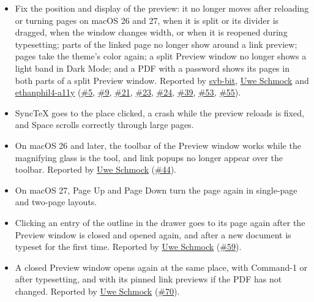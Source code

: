 \documentclass[11pt,letterpaper]{article}
\begin{document}
\begin{itemize}
\item Fix the position and display of the preview: it no longer moves after reloading or turning pages on macOS 26 and 27, when it is split or its divider is dragged, when the window changes width, or when it is reopened during typesetting; parts of the linked page no longer show around a link preview; pages take the theme’s color again; a split Preview window no longer shows a light band in Dark Mode; and a PDF with a password shows its pages in both parts of a split Preview window. Reported by \href{https://github.com/svb-bit}{svb-bit}, \href{https://github.com/Uwe-Schmock}{Uwe Schmock} and \href{https://github.com/ethanphil4-a11y}{ethanphil4-a11y} (\href{https://github.com/TeXShopProject/TeXShop/issues/5}{\#5}, \href{https://github.com/TeXShopProject/TeXShop/issues/9}{\#9}, \href{https://github.com/TeXShopProject/TeXShop/issues/21}{\#21}, \href{https://github.com/TeXShopProject/TeXShop/issues/23}{\#23}, \href{https://github.com/TeXShopProject/TeXShop/issues/24}{\#24}, \href{https://github.com/TeXShopProject/TeXShop/issues/39}{\#39}, \href{https://github.com/TeXShopProject/TeXShop/issues/53}{\#53}, \href{https://github.com/TeXShopProject/TeXShop/issues/55}{\#55}).
\item SyncTeX goes to the place clicked, a crash while the preview reloads is fixed, and Space scrolls correctly through large pages.
\item On macOS 26 and later, the toolbar of the Preview window works while the magnifying glass is the tool, and link popups no longer appear over the toolbar. Reported by \href{https://github.com/Uwe-Schmock}{Uwe Schmock} (\href{https://github.com/TeXShopProject/TeXShop/issues/44}{\#44}).
\item On macOS 27, Page Up and Page Down turn the page again in single-page and two-page layouts.
\item Clicking an entry of the outline in the drawer goes to its page again after the Preview window is closed and opened again, and after a new document is typeset for the first time. Reported by \href{https://github.com/Uwe-Schmock}{Uwe Schmock} (\href{https://github.com/TeXShopProject/TeXShop/issues/59}{\#59}).
\item A closed Preview window opens again at the same place, with Command-1 or after typesetting, and with its pinned link previews if the PDF has not changed. Reported by \href{https://github.com/Uwe-Schmock}{Uwe Schmock} (\href{https://github.com/TeXShopProject/TeXShop/issues/70}{\#70}).

\end{itemize}
\end{document}
